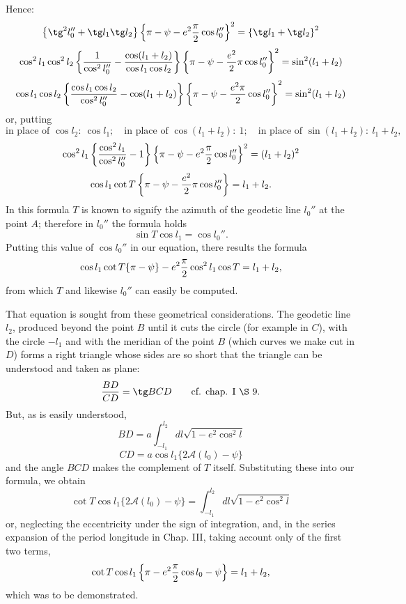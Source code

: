 \begingroup\small
Hence:
\[
\left\{\tg^2l_0''+\tg l_1\tg l_2\right\}\left\{\pi-\psi-e^2{\pi\over2}\cos l_0''\right\}^2=\left\{\tg l_1+\tg l_2\right\}^2
\]
\[
 \cos^2l_1\cos^2l_2\left\{{1\over\cos^2l_0''}-{\cos(l_1+l_2)\over\cos l_1\cos l_2}\right\}\left\{\pi-\psi-{e^2\over2}\pi\cos l_0''\right\}^2=\sin^2(l_1+l_2)
\]
\[
 \cos l_1\cos l_2\left\{{\cos l_1\cos l_2\over\cos^2l_0''}-\cos(l_1+l_2)\right\}\left\{\pi-\psi-{e^2\pi\over2}\cos l_0''\right\}^2=\sin^2(l_1+l_2)
\]
or, putting
\[
\text{in place of }\cos l_2:\ \cos l_1;\quad \text{in place of }\cos(l_1+l_2):\ 1;\quad \text{in place of }\sin(l_1+l_2):\ l_1+l_2,
\]
\[
 \cos^2l_1\left\{{\cos^2l_1\over\cos^2l_0''}-1\right\}\left\{\pi-\psi-e^2{\pi\over2}\cos l_0''\right\}^2=(l_1+l_2)^2
\]
\[
 \cos l_1\cot T\left\{\pi-\psi-{e^2\over2}\pi\cos l_0''\right\}=l_1+l_2.
\]
In this formula $T$ is known to signify the azimuth of the geodetic line $l_0''$ at the point $A$; therefore in $l_0''$ the formula holds
\[
 \sin T\cos l_1=\cos l_0''.
\]
Putting this value of $\cos l_0''$ in our equation, there results the formula
\[
 \cos l_1\cot T\{\pi-\psi\}-e^2{\pi\over2}\cos^2l_1\cos T=l_1+l_2,
\]
from which $T$ and likewise $l_0''$ can easily be computed.

That equation is sought from these geometrical considerations. The geodetic line $l_2$, produced beyond the point $B$ until it cuts the circle  (for example in $C$), with the circle $-l_1$ and with the meridian of the point $B$ (which curves we make cut in $D$) forms a right triangle whose sides are so short that the triangle can be understood and taken as plane:
\[
 {BD\over CD}=\tg BCD \qquad\text{cf. chap. I \S\ 9.}
\]
But, as is easily understood,
\[
 BD=a\int_{-l_1}^{l_2} dl\sqrt{1-e^2\cos^2l}
\]
\[
 CD=a\cos l_1\{2\mathcal A(l_0)-\psi\}
\]
and the angle $BCD$ makes the complement of $T$ itself. Substituting these into our formula, we obtain
\[
 \cot T\cos l_1\{2\mathcal A(l_0)-\psi\}=\int_{-l_1}^{l_2}dl\sqrt{1-e^2\cos^2l}
\]
or, neglecting the eccentricity under the sign of integration, and, in the series expansion of the period longitude in Chap. III, taking account only of the first two terms,
\[
 \cot T\cos l_1\left\{\pi-e^2{\pi\over2}\cos l_0-\psi\right\}=l_1+l_2,
\]
which was to be demonstrated.
\endgroup
